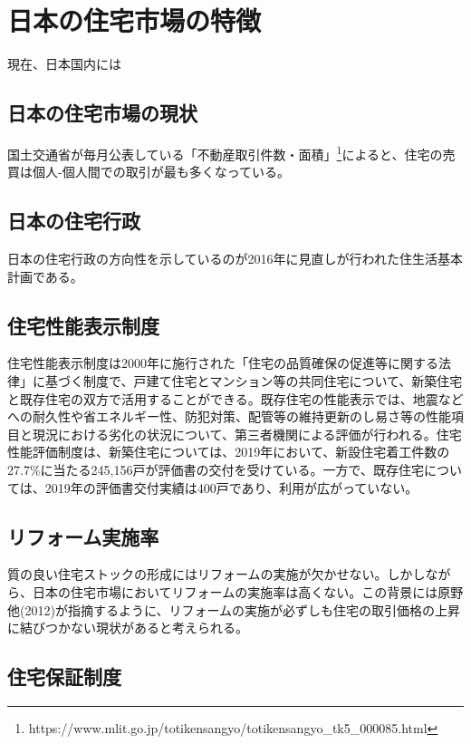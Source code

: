 \documentclass[a4paper,11pt]{jlreq}
\begin{document}
\section{日本の住宅市場の特徴}
現在、日本国内には

\subsection{日本の住宅市場の現状}
国土交通省が毎月公表している「不動産取引件数・面積」\footnote{https://www.mlit.go.jp/totikensangyo/totikensangyo\_tk5\_000085.html}によると、住宅の売買は個人-個人間での取引が最も多くなっている。

\subsection{日本の住宅行政}
日本の住宅行政の方向性を示しているのが2016年に見直しが行われた住生活基本計画である。

\subsection{住宅性能表示制度}
住宅性能表示制度は2000年に施行された「住宅の品質確保の促進等に関する法律」に基づく制度で、戸建て住宅とマンション等の共同住宅について、新築住宅と既存住宅の双方で活用することができる。既存住宅の性能表示では、地震などへの耐久性や省エネルギー性、防犯対策、配管等の維持更新のし易さ等の性能項目と現況における劣化の状況について、第三者機関による評価が行われる。住宅性能評価制度は、新築住宅については、2019年において、新設住宅着工件数の27.7\%に当たる245,156戸が評価書の交付を受けている。一方で、既存住宅については、2019年の評価書交付実績は400戸であり、利用が広がっていない。


\subsection{リフォーム実施率}
質の良い住宅ストックの形成にはリフォームの実施が欠かせない。しかしながら、日本の住宅市場においてリフォームの実施率は高くない。この背景には原野他(2012)が指摘するように、リフォームの実施が必ずしも住宅の取引価格の上昇に結びつかない現状があると考えられる。

\subsection{住宅保証制度}
\end{document}
